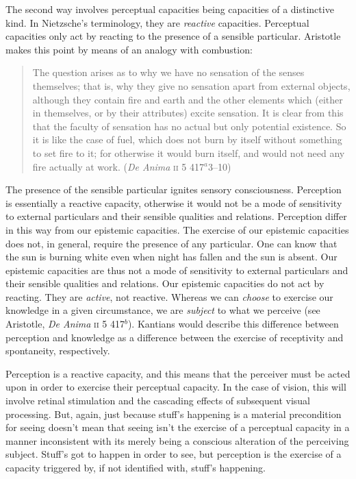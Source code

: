 \documentclass[12pt]{article}
\begin{document}
The second way involves perceptual capacities being capacities of a distinctive kind. In Nietzsche's \citeyearpar{Nietzsche1887On-the-Genealog} terminology, they are \emph{reactive} capacities. Perceptual capacities only act by reacting to the presence of a sensible particular. Aristotle makes this point by means of an analogy with combustion:
\begin{quote}
	The question arises as to why we have no sensation of the senses themselves; that is, why they give no sensation apart from external objects, although they contain fire and earth and the other elements which (either in themselves, or by their attributes) excite sensation. It is clear from this that the faculty of sensation has no actual but only potential existence. So it is like the case of fuel, which does not burn by itself without something to set fire to it; for otherwise it would burn itself, and would not need any fire actually at work. (\emph{De Anima} \textsc{ii} 5 417\( ^{a} \)3--10)
\end{quote}
The presence of the sensible particular ignites sensory consciousness. Perception is essentially a reactive capacity, otherwise it would not be a mode of sensitivity to external particulars and their sensible qualities and relations. Perception differ in this way from our epistemic capacities. The exercise of our epistemic capacities does not, in general, require the presence of any particular. One can know that the sun is burning white even when night has fallen and the sun is absent. Our epistemic capacities are thus not a mode of sensitivity to external particulars and their sensible qualities and relations. Our epistemic capacities do not act by reacting. They are \emph{active}, not reactive. Whereas we can \emph{choose} to exercise our knowledge in a given circumstance, we are \emph{subject} to what we perceive (see Aristotle, \emph{De Anima} \textsc{ii} 5 417\( ^{b} \)). Kantians would describe this difference between perception and knowledge as a difference between the exercise of receptivity and spontaneity, respectively. 

Perception is a reactive capacity, and this means that the perceiver must be acted upon in order to exercise their perceptual capacity. In the case of vision, this will involve retinal stimulation and the cascading effects of subsequent visual processing. But, again, just because stuff's happening is a material precondition for seeing doesn't mean that seeing isn't the exercise of a perceptual capacity in a manner inconsistent with its merely being a conscious alteration of the perceiving subject. Stuff's got to happen in order to see, but perception is the exercise of a capacity triggered by, if not identified with, stuff's happening.
\end{document}
